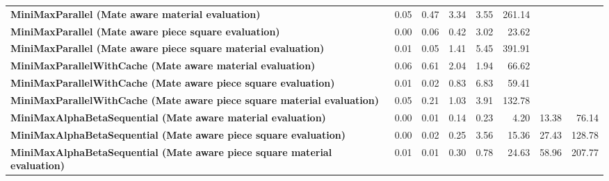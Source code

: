 \begin{table}[H]
{\begin{tabular}{|p{8cm}|*{7}{r|}}
            \rowcolor[HTML]{FFFFFF}
            \textbf{MiniMaxParallel (Mate aware material evaluation)}                                  & 0.05                                  & 0.47                                  & 3.34                                  & 3.55                                  & 261.14 &  &  \\
            \rowcolor[HTML]{EFEFEF}
            \textbf{MiniMaxParallel (Mate aware piece square evaluation)}                              & 0.00                                  & 0.06                                  & 0.42                                  & 3.02 & 23.62 &  &  \\
            \rowcolor[HTML]{FFFFFF}
            \textbf{MiniMaxParallel (Mate aware piece square material evaluation)}                     & 0.01                                  & 0.05 & 1.41 & 5.45 & 391.91 &  &  \\

            \rowcolor[HTML]{EFEFEF}
            \textbf{MiniMaxParallelWithCache (Mate aware material evaluation)}                         & 0.06                                  & 0.61                                  & 2.04 & 1.94 & 66.62 &  &  \\
            \rowcolor[HTML]{FFFFFF}
            \textbf{MiniMaxParallelWithCache (Mate aware piece square evaluation)}                     & 0.01                                  & 0.02 & 0.83 & 6.83 & 59.41 &  &  \\
            \rowcolor[HTML]{EFEFEF}
            \textbf{MiniMaxParallelWithCache (Mate aware piece square material evaluation)}            & 0.05 & 0.21 & 1.03 & 3.91 & 132.78 &  &  \\

            \rowcolor[HTML]{FFFFFF}
            \textbf{MiniMaxAlphaBetaSequential (Mate aware material evaluation)}                       & 0.00                                  & 0.01                                  & 0.14 & 0.23 & 4.20 & 13.38 & 76.14 \\
            \rowcolor[HTML]{EFEFEF}
            \textbf{MiniMaxAlphaBetaSequential (Mate aware piece square evaluation)}                   & 0.00                                  & 0.02 & 0.25 & 3.56 & 15.36 & 27.43 & 128.78 \\
            \rowcolor[HTML]{FFFFFF}
            \textbf{MiniMaxAlphaBetaSequential (Mate aware piece square material evaluation)}               & 0.01 & 0.01 & 0.30 & 0.78 & 24.63 & 58.96 & 207.77 \\


\end{tabular}}
\end{table}
